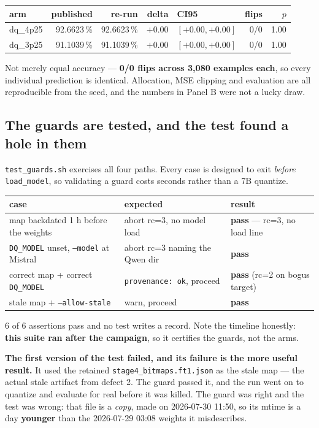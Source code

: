 \documentclass[11pt]{article}
\newcommand{\pct}{\,\%}
\newcommand{\code}[1]{\texttt{#1}}
\begin{document}
\begin{center}\small
\begin{tabular}{@{}lrrrlrr@{}}
\toprule
arm & published & re-run & delta & CI95 & flips & $p$ \\
\midrule
dq\_4p25 & 92.6623\pct & 92.6623\pct & $+0.00$ & $[+0.00, +0.00]$ & 0/0 & 1.00 \\
dq\_3p25 & 91.1039\pct & 91.1039\pct & $+0.00$ & $[+0.00, +0.00]$ & 0/0 & 1.00 \\
\bottomrule
\end{tabular}
\end{center}

Not merely equal accuracy --- \textbf{0/0 flips across 3{,}080 examples each}, so every individual
prediction is identical. Allocation, MSE clipping and evaluation are all reproducible from the
seed, and the numbers in Panel B were not a lucky draw.

\subsection{The guards are tested, and the test found a hole in them}

\code{test\_guards.sh} exercises all four paths. Every case is designed to exit \emph{before}
\code{load\_model}, so validating a guard costs seconds rather than a 7B quantize.

\begin{center}\small
\begin{tabular}{@{}lll@{}}
\toprule
case & expected & result \\
\midrule
map backdated 1 h before the weights & abort rc=3, no model load & \textbf{pass} --- rc=3, no load line \\
\code{DQ\_MODEL} unset, \code{--model} at Mistral & abort rc=3 naming the Qwen dir & \textbf{pass} \\
correct map + correct \code{DQ\_MODEL} & \code{provenance: ok}, proceed & \textbf{pass} (rc=2 on bogus target) \\
stale map + \code{--allow-stale} & warn, proceed & \textbf{pass} \\
\bottomrule
\end{tabular}
\end{center}

6 of 6 assertions pass and no test writes a record. Note the timeline honestly: \textbf{this suite
ran after the campaign}, so it certifies the guards, not the arms.

\textbf{The first version of the test failed, and its failure is the more useful result.} It used
the retained \code{stage4\_bitmaps.ft1.json} as the stale map --- the actual stale artifact from
defect 2. The guard passed it, and the run went on to quantize and evaluate for real before it was
killed. The guard was right and the test was wrong: that file is a \emph{copy}, made on 2026-07-30
11:50, so its mtime is a day \textbf{younger} than the 2026-07-29 03:08 weights it misdescribes.
\end{document}
